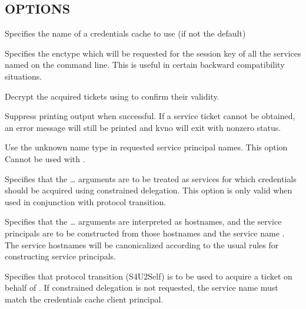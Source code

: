 \documentclass[letterpaper,10pt,english]{sphinxmanual}
\begin{document}
\subsection{OPTIONS}
\label{\detokenize{user/user_commands/kvno:options}}\begin{description}
\sphinxAtStartPar
Specifies the name of a credentials cache to use (if not the
default)

\sphinxAtStartPar
Specifies the enctype which will be requested for the session key
of all the services named on the command line.  This is useful in
certain backward compatibility situations.

\sphinxAtStartPar
Decrypt the acquired tickets using  to confirm their
validity.

\sphinxAtStartPar
Suppress printing output when successful.  If a service ticket
cannot be obtained, an error message will still be printed and
kvno will exit with nonzero status.

\sphinxAtStartPar
Use the unknown name type in requested service principal names.
This option Cannot be used with .

\sphinxAtStartPar
Specifies that the  …  arguments are to be
treated as services for which credentials should be acquired using
constrained delegation.  This option is only valid when used in
conjunction with protocol transition.

\sphinxAtStartPar
Specifies that the  … arguments are
interpreted as hostnames, and the service principals are to be
constructed from those hostnames and the service name .
The service hostnames will be canonicalized according to the usual
rules for constructing service principals.

\sphinxAtStartPar
Specifies that protocol transition (S4U2Self) is to be used to
acquire a ticket on behalf of .  If constrained
delegation is not requested, the service name must match the
credentials cache client principal.


\end{description}
\end{document}
